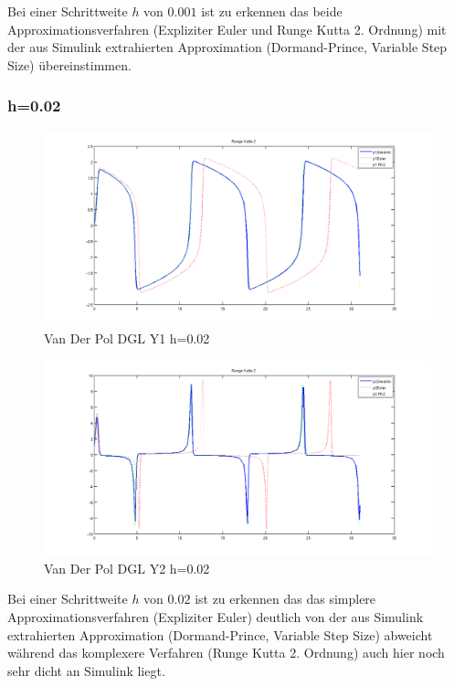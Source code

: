 \documentclass[10pt]{scrartcl}
\begin{document}
	Bei einer Schrittweite $h$ von $0.001$ ist zu erkennen das beide Approximationsverfahren (Expliziter Euler und Runge Kutta 2. Ordnung) mit der aus Simulink extrahierten Approximation (Dormand-Prince, Variable Step Size) übereinstimmen.
		
	\subsubsection{h=0.02}	
		\begin{figure}[H]
			\centering	
			\includegraphics[width=\textwidth]{vanDerPolY102.png}
            \caption{Van Der Pol DGL Y1 h=0.02}
            \label{pic:y2vdp02}
		\end{figure} 
		
		\begin{figure}[H]
			\centering	
			\includegraphics[width=\textwidth]{vanDerPolY202.png}
            \caption{Van Der Pol DGL Y2 h=0.02}
            \label{pic:y2vdp02}
		\end{figure}		
		
	Bei einer Schrittweite $h$ von $0.02$ ist zu erkennen das das simplere Approximationsverfahren (Expliziter Euler) deutlich von der aus Simulink extrahierten Approximation (Dormand-Prince, Variable Step Size) abweicht während das komplexere Verfahren (Runge Kutta 2. Ordnung) auch hier noch sehr dicht an Simulink liegt.
	
\end{document}
